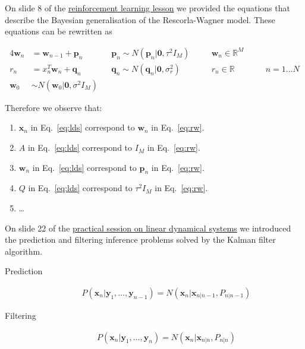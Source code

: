 \documentclass[12pt]{article}
\begin{document}
On slide 8 of the
\href{https://github.com/joacorapela/neuroinformatics24/blob/master/lectures/10_reinforcementLearning/RLinTheBrain_SWC_2024.pdf#page=8}{reinforcement
learning lesson} we provided the equations that describe the Bayesian
generalisation of the Rescorla-Wagner model. These equations can be rewritten
as

\begin{alignat}{4}
    \mathbf{w}_n &= \mathbf{w}_{n-1}+\mathbf{p}_n\quad && \mathbf{p}_n\sim
    N(\mathbf{p}_n|\mathbf{0}, \tau^2I_M)\quad &&
    \mathbf{w}_n\in\mathbb{R}^M&&\nonumber\\
    r_n &= x_n^T \mathbf{w}_{n}+\mathbf{q}_n\quad && \mathbf{q}_n\sim
    N(\mathbf{q}_n|\mathbf{0}, \sigma^2_r)\quad &&
    r_n\in\mathbb{R}&&\quad n=1\ldots N\label{eq:rw}\\
    \mathbf{w}_0 &\sim N(\mathbf{w}_0|\mathbf{0}, \sigma^2I_M) && &&\nonumber
\end{alignat}

Therefore we observe that:

\begin{enumerate}
    \item $\mathbf{x}_n$ in Eq.~\ref{eq:lds} correspond to $\mathbf{w}_n$ in Eq.~\ref{eq:rw}.
    \item $A$ in Eq.~\ref{eq:lds} correspond to $I_M$ in Eq.~\ref{eq:rw}.
    \item $\mathbf{w}_n$ in Eq.~\ref{eq:lds} correspond to $\mathbf{p}_n$ in Eq.~\ref{eq:rw}.
    \item $Q$ in Eq.~\ref{eq:lds} correspond to $\tau^2I_M$ in Eq.~\ref{eq:rw}.
    \item \ldots
\end{enumerate}

On slide 22 of the
\href{https://www.gatsby.ucl.ac.uk/~rapela/neuroinformatics/2023/ldsLecture/ldsForNeuro.pdf#page=22}{practical
session on linear dynamical systems} we introduced the prediction and
filtering inference problems solved by the Kalman filter algorithm.

\begin{description}
    \item[Prediction]
        \begin{align}
            P(\mathbf{x}_n|\mathbf{y}_1,\ldots,\mathbf{y}_{n-1})=N(\mathbf{x}_n|\mathbf{x}_{n|n-1},P_{n|n-1})\nonumber
        \end{align}
    \item[Filtering]
        \begin{align}
            P(\mathbf{x}_n|\mathbf{y}_1,\ldots,\mathbf{y}_{n})=N(\mathbf{x}_n|\mathbf{x}_{n|n},P_{n|n})\nonumber
        \end{align}
\end{description}
\end{document}
